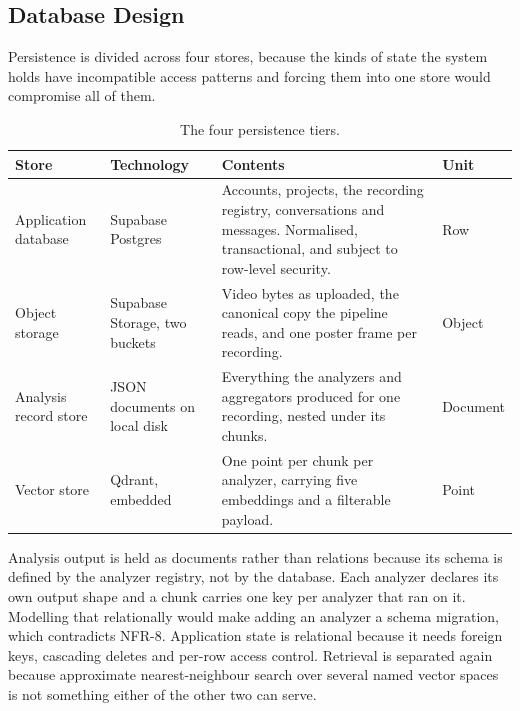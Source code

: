 \documentclass[11pt,a4paper]{article}
\begin{document}
\subsection{Database Design}

Persistence is divided across four stores, because the kinds of state the system
holds have incompatible access patterns and forcing them into one store would
compromise all of them.

\begin{table}[htbp]
\centering
\small
\begin{tabularx}{\textwidth}{@{}L{2.8cm}L{3.0cm}XL{1.6cm}@{}}
\toprule
\textbf{Store} & \textbf{Technology} & \textbf{Contents} & \textbf{Unit} \\
\midrule
Application database & Supabase Postgres & Accounts, projects, the recording registry, conversations and messages. Normalised, transactional, and subject to row-level security. & Row \\
Object storage & Supabase Storage, two buckets & Video bytes as uploaded, the canonical copy the pipeline reads, and one poster frame per recording. & Object \\
Analysis record store & JSON documents on local disk & Everything the analyzers and aggregators produced for one recording, nested under its chunks. & Document \\
Vector store & Qdrant, embedded & One point per chunk per analyzer, carrying five embeddings and a filterable payload. & Point \\
\bottomrule
\end{tabularx}
\caption{The four persistence tiers.}
\end{table}

Analysis output is held as documents rather than relations because its schema is
defined by the analyzer registry, not by the database. Each analyzer declares its
own output shape and a chunk carries one key per analyzer that ran on it.
Modelling that relationally would make adding an analyzer a schema migration,
which contradicts NFR-8. Application state is relational because it needs
foreign keys, cascading deletes and per-row access control. Retrieval is
separated again because approximate nearest-neighbour search over several named
vector spaces is not something either of the other two can serve.
\end{document}
